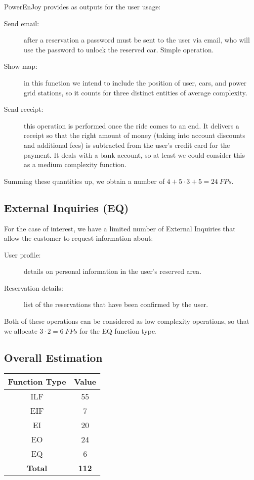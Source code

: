 PowerEnJoy provides as outputs for the user usage:

\begin{description}
\item[Send email:] after a reservation a password must be sent to the user via email, who will use the password to unlock the reserved car. Simple operation.
\item[Show map:] in this function we intend to include the position of user, cars, and power grid stations, so it counts for three distinct entities of average complexity.
\item[Send receipt:] this operation is performed once the ride comes to an end. It delivers a receipt so that the right amount of money (taking into account discounts and additional fees) is subtracted from the user's credit card for the payment. It deals with a bank account, so at least we could consider this as a medium complexity function.
\end{description}

Summing these quantities up, we obtain a number of \( 4 + 5 \cdot 3 + 5 = 24 \> FPs \).

\subsection{External Inquiries (EQ)}

For the case of interest, we have a limited number of External Inquiries that allow the customer to request information about:

\begin{description}
\item[User profile:] details on personal information in the user's reserved area.
\item[Reservation details:] list of the reservations that have been confirmed by the user.
\end{description}

Both of these operations can be considered as low complexity operations, so that we allocate \(3 \cdot 2 = 6 \> FPs \) for the EQ function type.

\subsection{Overall Estimation}

\begin{center}
\begin{tabular}{ | c | c | }
\hline
	\textbf{Function Type} & \textbf{Value} \\ \hline\hline
	ILF & 55 \\ \hline
	EIF & 7 \\ \hline
	EI & 20 \\ \hline
	EO & 24 \\ \hline
	EQ & 6 \\ \hline\hline
	\textbf{Total} & \textbf{112} \\ \hline
\end{tabular}
\end{center}

